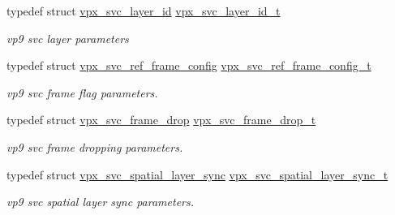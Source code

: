 \begin{DoxyCompactItemize}
typedef struct \hyperlink{structvpx__svc__layer__id}{vpx\+\_\+svc\+\_\+layer\+\_\+id} \hyperlink{group__vp8__encoder_gaba42cb92c1895ae9f7214484c5488cd5}{vpx\+\_\+svc\+\_\+layer\+\_\+id\+\_\+t}
\begin{DoxyCompactList}\small\item\em vp9 svc layer parameters \end{DoxyCompactList}\item 
typedef struct \hyperlink{structvpx__svc__ref__frame__config}{vpx\+\_\+svc\+\_\+ref\+\_\+frame\+\_\+config} \hyperlink{group__vp8__encoder_ga50dc69f110ac04b16478e2db6e89e0db}{vpx\+\_\+svc\+\_\+ref\+\_\+frame\+\_\+config\+\_\+t}
\begin{DoxyCompactList}\small\item\em vp9 svc frame flag parameters. \end{DoxyCompactList}\item 
typedef struct \hyperlink{structvpx__svc__frame__drop}{vpx\+\_\+svc\+\_\+frame\+\_\+drop} \hyperlink{group__vp8__encoder_ga6e876ef2b981300123670145ba652bd3}{vpx\+\_\+svc\+\_\+frame\+\_\+drop\+\_\+t}
\begin{DoxyCompactList}\small\item\em vp9 svc frame dropping parameters. \end{DoxyCompactList}\item 
typedef struct \hyperlink{structvpx__svc__spatial__layer__sync}{vpx\+\_\+svc\+\_\+spatial\+\_\+layer\+\_\+sync} \hyperlink{group__vp8__encoder_ga7b4f4746d01150d9e73a03bdd8eee296}{vpx\+\_\+svc\+\_\+spatial\+\_\+layer\+\_\+sync\+\_\+t}
\begin{DoxyCompactList}\small\item\em vp9 svc spatial layer sync parameters. \end{DoxyCompactList}\end{DoxyCompactItemize}

